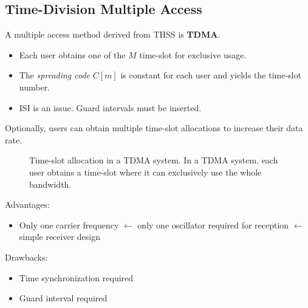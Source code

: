 \begin{refsection}

\subsection{Time-Division Multiple Access}

A multiple access method derived from \ac{THSS} is  \textbf{\acf{TDMA}}.
\begin{itemize}
	\item Each user obtains one of the $M$ time-slot for exclusive usage.
	\item The \emph{spreading code} $C[m]$ is constant for each user and yields the time-slot number.
	\item \ac{ISI} is an issue. Guard intervals must be inserted.
\end{itemize}

\begin{remark}
	Optionally, users can obtain multiple time-slot allocations to increase their data rate.
\end{remark}

\begin{figure}[H]
	\centering
	\caption[Time-slot allocation in a \acs{TDMA} system]{Time-slot allocation in a \acs{TDMA} system. In a \acs{TDMA} system, each user obtains a time-slot where it can exclusively use the whole bandwidth.}
\end{figure}

Advantages:
\begin{itemize}
	\item Only one carrier frequency $\leftarrow$ only one oscillator required for reception $\leftarrow$ simple receiver design
\end{itemize}

Drawbacks:
\begin{itemize}
	\item Time synchronization required
	\item Guard interval required
\end{itemize}


\end{refsection}
